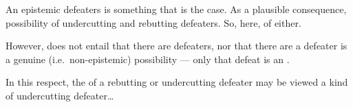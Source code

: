 \begin{note}
  An epistemic defeaters is something that is the case.
  As a plausible consequence, possibility of undercutting and rebutting defeaters.
  So, here, \epAdv{} of either.
\end{note}

\begin{note}
  However, does not entail that there are defeaters, nor that there are a defeater is a genuine (i.e.\ non-epistemic) possibility --- only that defeat is an \ep{}.
\end{note}

\begin{note}
  In this respect, the \ep{} of a rebutting or undercutting defeater may be viewed a kind of undercutting defeater\dots
\end{note}

